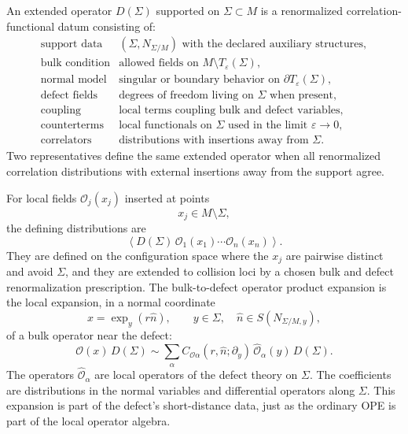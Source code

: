 \begin{definition}
\label{def:extended-operator-datum}
An extended operator \(D(\Sigma)\) supported on \(\Sigma\subset M\) is a
renormalized correlation-functional datum consisting of:
\[
\begin{array}{ll}
  \text{support data} &
  (\Sigma,N_{\Sigma/M})\text{ with the declared auxiliary structures},\\[1mm]
  \text{bulk condition} &
  \text{allowed fields on }M\setminus T_\varepsilon(\Sigma),\\[1mm]
  \text{normal model} &
  \text{singular or boundary behavior on }\partial T_\varepsilon(\Sigma),\\[1mm]
  \text{defect fields} &
  \text{degrees of freedom living on }\Sigma\text{ when present},\\[1mm]
  \text{coupling} &
  \text{local terms coupling bulk and defect variables},\\[1mm]
  \text{counterterms} &
  \text{local functionals on }\Sigma\text{ used in the limit }\varepsilon\to0,\\[1mm]
  \text{correlators} &
  \text{distributions with insertions away from }\Sigma .
\end{array}
\]
Two representatives define the same extended operator when all renormalized
correlation distributions with external insertions away from the support
agree.
\end{definition}

For local fields \(\mathcal O_j(x_j)\) inserted at points
\[
  x_j\in M\setminus\Sigma ,
\]
the defining distributions are
\[
  \left\langle
    D(\Sigma)\,\mathcal O_1(x_1)\cdots\mathcal O_n(x_n)
  \right\rangle .
\]
They are defined on the configuration space where the \(x_j\) are pairwise
distinct and avoid \(\Sigma\), and they are extended to collision loci by a
chosen bulk and defect renormalization prescription.  The bulk-to-defect
operator product expansion is the local expansion, in a normal coordinate
\[
  x=\exp_y(r\hat n),\qquad y\in\Sigma,\quad \hat n\in S(N_{\Sigma/M,y}),
\]
of a bulk operator near the defect:
\[
  \mathcal O(x)\,D(\Sigma)
  \sim
  \sum_\alpha C_{\mathcal O\alpha}(r,\hat n;\partial_y)\,
  \widehat{\mathcal O}_\alpha(y)\,D(\Sigma).
\]
The operators \(\widehat{\mathcal O}_\alpha\) are local operators of the
defect theory on \(\Sigma\).  The coefficients are distributions in the
normal variables and differential operators along \(\Sigma\).  This expansion
is part of the defect's short-distance data, just as the ordinary OPE is part
of the local operator algebra.

